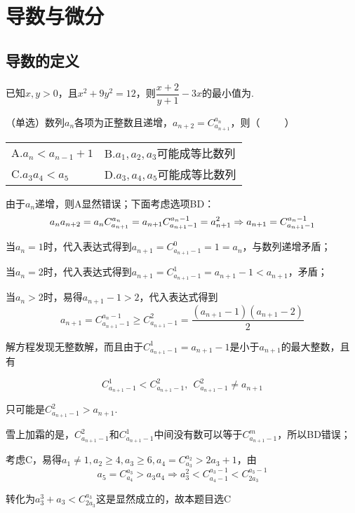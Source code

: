 \chapter{导数与微分}
\section{导数的定义}
\begin{example}{}{}
    已知$x,y>0$，且$x^2+9y^2=12$，则$\dfrac{x+2}{y+1}-3x$的最小值为\underline{\hspace{2cm}}.
\end{example}
\begin{solution}

\end{solution}
\begin{example}{}{}
    （单选）数列$a_{n}$各项为正整数且递增，$a_{n+2}=C_{a_{n+1}}^{a_{n}}$，则（~~~~~）

    \begin{tabular}{@{}ll@{}}
        A.$a_n<a_{n-1}+1$&B.$a_1,a_2,a_3$可能成等比数列\\
        C.$a_3a_4<a_5$&D.$a_3,a_4,a_5$可能成等比数列
    \end{tabular}
\end{example}
\begin{solution}
由于$a_n$递增，则A显然错误；下面考虑选项BD：
\[
    a_na_{n+2} = a_nC_{a_{n+1}}^{a_{n}}=a_{n+1}C_{a_{n+1}-1}^{a_{n}-1}=a_{n+1}^2\\\Rightarrow a_{n+1}=C_{a_{n+1}-1}^{a_{n}-1}
\]

当$a_n=1$时，代入表达式得到$a_{n+1}=C_{a_{n+1}-1}^{0}=1=a_n$，与数列递增矛盾；

当$a_n=2$时，代入表达式得到$a_{n+1}=C_{a_{n+1}-1}^{1}=a_{n+1}-1<a_{n+1}$，矛盾；

当$a_n>2$时，易得$a_{n+1}-1>2$，代入表达式得到
\[a_{n+1}=C_{a_{n+1}-1}^{a_{n}-1}\ge C_{a_{n+1}-1}^{2}=\dfrac{(a_{n+1}-1)(a_{n+1}-2)}{2}\]

解方程发现无整数解，而且由于$C_{a_{n+1}-1}^{1}=a_{n+1}-1$是小于$a_{n+1}$的最大整数，且有

\[C_{a_{n+1}-1}^{1}<C_{a_{n+1}-1}^{2},~~C_{a_{n+1}-1}^{2}\ne a_{n+1}\]

只可能是$C_{a_{n+1}-1}^{2}> a_{n+1}$.

雪上加霜的是，$C_{a_{n+1}-1}^{2}$和$C_{a_{n+1}-1}^{1}$中间没有数可以等于$C_{a_{n+1}-1}^{m}$，所以BD错误；

考虑C，易得$a_1\ne1,a_2\ge 4,a_3\ge6,a_4=C_{a_3}^{a_2}>2a_3+1$，由
\[a_5=C_{a_4}^{a_3}>a_3a_4 \Rightarrow a_3^2<C_{a_{4}-1}^{a_{3}-1}<C_{2a_3}^{a_3-1}\]

转化为$a_3^3+a_3<C_{2a_3}^{a_3}$这是显然成立的，故本题目选C
\end{solution}
